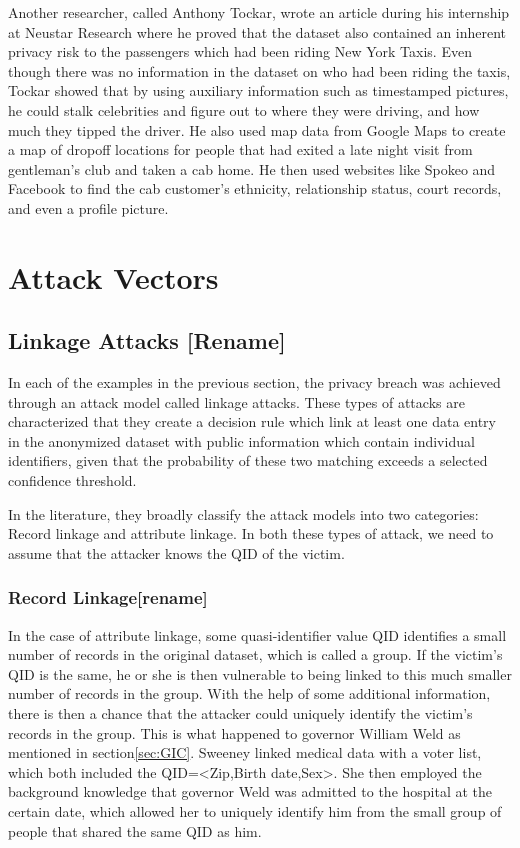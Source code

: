 Another researcher, called Anthony Tockar, wrote an article during his internship at Neustar Research where he proved that the dataset also contained an inherent privacy risk to the passengers which had been riding New York Taxis. Even though there was no information in the dataset on who had been riding the taxis, Tockar showed that by using auxiliary information such as timestamped pictures, he could stalk celebrities and figure out to where they were driving, and how much they tipped the driver. He also used map data from Google Maps to create a map of dropoff locations for people that had exited a late night visit from gentleman's club and taken a cab home. He then used websites like Spokeo and Facebook to find the cab customer's ethnicity, relationship status, court records, and even a profile picture\cite{tockar2014online}.

\section{Attack Vectors}


\subsection{Linkage Attacks [Rename]}
In each of the examples in the previous section, the privacy breach was achieved through an attack model called linkage attacks. These types of attacks are characterized that they create a decision rule which link at least one data entry in the anonymized dataset with public information which contain individual identifiers, given that the probability of these two matching exceeds a selected confidence threshold. 

In the literature\cite{bonchi2010privacybook,fung2010privacybook}, they broadly classify the attack models into two categories: Record linkage and attribute linkage. In both these types of attack, we need to assume that the attacker knows the QID of the victim.

\subsubsection{Record Linkage[rename]}
In the case of attribute linkage, some quasi-identifier value QID identifies a small number of records in the original dataset, which is called a group. If the victim's QID is the same, he or she is then vulnerable to being linked to this much smaller number of records in the group. With the help of some additional information, there is then a chance that the attacker could uniquely identify the victim's records in the group. This is what happened to governor William Weld as mentioned in section\ref{sec:GIC}. Sweeney linked medical data with a voter list, which both included the QID=<Zip,Birth date,Sex>. She then employed the background knowledge that governor Weld was admitted to the hospital at the certain date, which allowed her to uniquely identify him from the small group of people that shared the same QID as him. 

